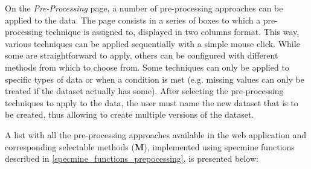 On the \textit{Pre-Processing} page, a number of pre-processing approaches can be applied to the data. The page consists in a series of boxes to which a pre-processing technique is assigned to, displayed in two columns format. This way, various techniques can be applied sequentially with a simple mouse click. While some are straightforward to apply, others can be configured with different methods from which to choose from. Some techniques can only be applied to specific types of data or when a condition is met (e.g. missing values can only be treated if the dataset actually has some). After selecting the pre-processing techniques to apply to the data, the user must name the new dataset that is to be created, thus allowing to create multiple versions of the dataset.

A list with all the pre-processing approaches available in the web application and corresponding selectable methods (\textbf{M}), implemented using specmine functions described in \autoref{specmine_functions_prepocessing}, is presented below:



